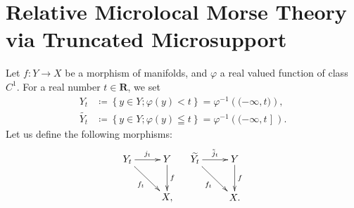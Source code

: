 ﻿\documentclass[a4paper,leqno]{jsarticle}
\theoremstyle{definition}
\newcommand{\rr}{\mathbf{R}}
\numberwithin{equation}{section}
\theoremstyle{mystyle}
\newcommand{\lopen}{\mathopen{(}}
\newcommand{\ropen}{\mathclose{)}}
\newcommand{\rclosed}{\mathopen{]}}
\newcommand{\smid}{\mathrel{;}}
\begin{document}
\section{Relative Microlocal Morse Theory via Truncated Microsupport}

Let \(f\colon Y\to X\) be a morphism of manifolds, and 
\(\varphi\) a real valued function of class \(C^1\). 
For a real number \(t\in \rr\), we set 
\begin{align*}
  Y_t
  &\coloneqq \left\{y\in Y\smid \varphi(y)< t\right\} 
  = \varphi^{-1}(\lopen-\infty,t\ropen),\\
  \widetilde{Y_t}
  &\coloneqq \left\{y\in Y\smid \varphi(y)\leqq t\right\} 
  = \varphi^{-1}(\lopen-\infty,t\rclosed).
\end{align*}
Let us define the following morphisms:
\[\xymatrix{
  Y_t\ar[r]^-{j_t}
  \ar[rd]_-{f_t}
  &
  Y
  \ar[d]^-{f}\\
  &X,
}\quad\xymatrix{
  \widetilde{Y_t}\ar[r]^-{\tilde{j}_t}
  \ar[rd]_-{f_t}
  &
  Y
  \ar[d]^-{f}\\
  &X.
}\]
\end{document}
